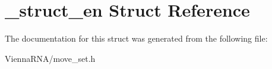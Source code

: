 \hypertarget{struct__struct__en}{}\section{\+\_\+struct\+\_\+en Struct Reference}
\label{struct__struct__en}


The documentation for this struct was generated from the following file\+:\begin{DoxyCompactItemize}
\item 
Vienna\+R\+N\+A/move\+\_\+set.\+h\end{DoxyCompactItemize}
